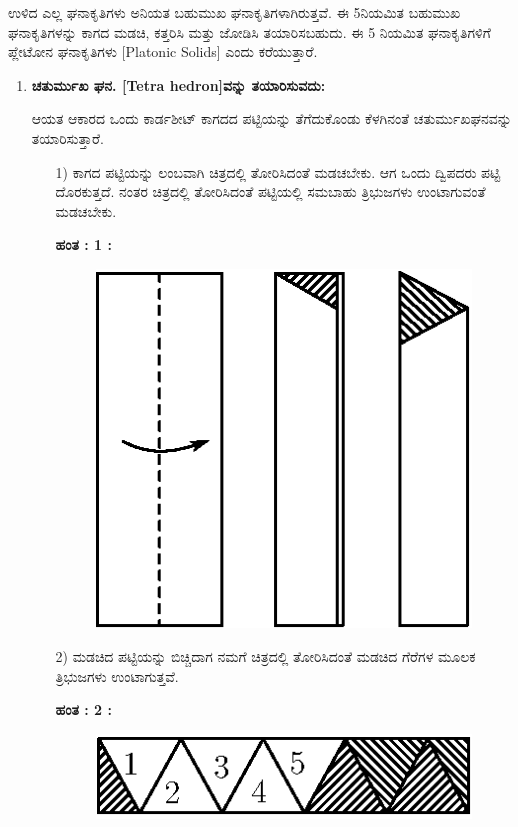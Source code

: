 \smallskip

ಉಳಿದ ಎಲ್ಲ ಘನಾಕೃತಿಗಳು ಅನಿಯತ ಬಹುಮುಖ ಘನಾಕೃತಿಗಳಾಗಿರುತ್ತವೆ. ಈ 5\break ನಿಯಮಿತ ಬಹುಮುಖ ಘನಾಕೃತಿಗಳನ್ನು ಕಾಗದ ಮಡಚಿ, ಕತ್ತರಿಸಿ ಮತ್ತು ಜೋಡಿಸಿ ತಯಾರಿಸಬಹುದು. ಈ  5 ನಿಯಮಿತ ಘನಾಕೃತಿಗಳಿಗೆ ಪ್ಲೇಟೋನ ಘನಾಕೃತಿಗಳು [Platonic Solids] ಎಂದು ಕರೆಯುತ್ತಾರೆ. 
\begin{enumerate}
\item \textbf{ಚತುರ್ಮುಖ ಘನ. [Tetra hedron]ವನ್ನು ತಯಾರಿಸುವದು:} 

ಆಯತ ಆಕಾರದ ಒಂದು ಕಾರ್ಡಶೀಟ್ ಕಾಗದದ ಪಟ್ಟಿಯನ್ನು ತೆಗೆದುಕೊಂಡು ಕೆಳಗಿನಂತೆ ಚತುರ್ಮುಖಘನವನ್ನು ತಯಾರಿಸುತ್ತಾರೆ. 
\begin{itemize}
\item[1)] ಕಾಗದ ಪಟ್ಟಿಯನ್ನು ಲಂಬವಾಗಿ ಚಿತ್ರದಲ್ಲಿ ತೋರಿಸಿದಂತೆ ಮಡಚಬೇಕು. ಆಗ ಒಂದು ದ್ವಿಪದರು ಪಟ್ಟಿ ದೊರಕುತ್ತದೆ. ನಂತರ ಚಿತ್ರದಲ್ಲಿ ತೋರಿಸಿದಂತೆ ಪಟ್ಟಿಯಲ್ಲಿ ಸಮಬಾಹು ತ್ರಿಭುಜಗಳು ಉಂಟಾಗುವಂತೆ ಮಡಚಬೇಕು. 

\eject


\noindent
\textbf{ಹಂತ : 1 :}
\begin{figure}[H]
\centering
\includegraphics[scale=.98]{src/figure/chap1/fig1-18.eps}
\end{figure}

\item[2)]  ಮಡಚಿದ ಪಟ್ಟಿಯನ್ನು ಬಿಚ್ಚಿದಾಗ ನಮಗೆ ಚಿತ್ರದಲ್ಲಿ ತೋರಿಸಿದಂತೆ ಮಡಚಿದ ಗೆರೆಗಳ ಮೂಲಕ ತ್ರಿಭುಜಗಳು ಉಂಟಾಗುತ್ತವೆ. 

\noindent
\textbf{ಹಂತ : 2 :}
\begin{figure}[H]
\centering
\includegraphics[scale=.98]{src/figure/chap1/fig1-18a.eps}
\end{figure}


\end{itemize}
\end{enumerate}

